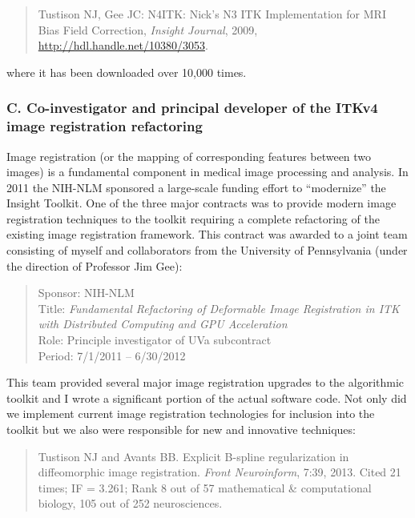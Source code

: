 \documentclass[11pt,]{article}
\begin{document}
\begin{quote}
Tustison NJ, Gee JC: N4ITK: Nick's N3 ITK Implementation for MRI Bias
Field Correction, \emph{Insight Journal}, 2009,
\url{http://hdl.handle.net/10380/3053}.
\end{quote}

where it has been downloaded over 10,000 times.

\subsubsection{C. Co-investigator and principal developer of the ITKv4
image registration
refactoring}\label{c.-co-investigator-and-principal-developer-of-the-itkv4-image-registration-refactoring}

Image registration (or the mapping of corresponding features between two
images) is a fundamental component in medical image processing and
analysis. In 2011 the NIH-NLM sponsored a large-scale funding effort to
``modernize'' the Insight Toolkit. One of the three major contracts was
to provide modern image registration techniques to the toolkit requiring
a complete refactoring of the existing image registration framework.
This contract was awarded to a joint team consisting of myself and
collaborators from the University of Pennsylvania (under the direction
of Professor Jim Gee):

\begin{quote}
Sponsor: NIH-NLM\\
Title: \emph{Fundamental Refactoring of Deformable Image Registration in
ITK with Distributed Computing and GPU Acceleration}\\
Role: Principle investigator of UVa subcontract\\
Period: 7/1/2011 -- 6/30/2012
\end{quote}

This team provided several major image registration upgrades to the
algorithmic toolkit and I wrote a significant portion of the actual
software code. Not only did we implement current image registration
technologies for inclusion into the toolkit but we also were responsible
for new and innovative techniques:

\begin{quote}
Tustison NJ and Avants BB. Explicit B-spline regularization in
diffeomorphic image registration. \emph{Front Neuroinform}, 7:39, 2013.
Cited 21 times; IF = 3.261; Rank 8 out of 57 mathematical \&
computational biology, 105 out of 252 neurosciences.
\end{quote}
\end{document}
